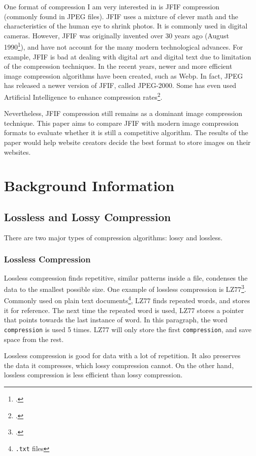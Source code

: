 \documentclass{article}
\begin{document}
One format of compression I am very interested in is JFIF compression (commonly found in JPEG files).
JFIF uses a mixture of clever math and the characteristics of the human eye to shrink photos.
It is commonly used in digital cameras.
However, JFIF was originally invented over 30 years ago (August 1990\footcite{jpeg}), and have not account for the many modern technological advances.
For example, JFIF is bad at dealing with digital art and digital text due to limitation of the compression techniques.
In the recent years, newer and more efficient image compression algorithms have been created, such as Webp. 
In fact, JPEG has released a newer version of JFIF, called JPEG-2000.
Some has even used Artificial Intelligence to enhance compression rates\footcite{googleAI}.

Nevertheless, JFIF compression still remains as a dominant image compression technique.
This paper aims to compare JFIF with modern image compression formats to evaluate whether it is still a competitive algorithm.
The results of the paper would help website creators decide the best format to store images on their websites.

\section{Background Information}

\subsection{Lossless and Lossy Compression}
\noindent There are two major types of compression algorithms: lossy and lossless.

\subsubsection{Lossless Compression}
Lossless compression finds repetitive, similar patterns inside a file, condenses the data to the smallest possible size.
One example of lossless compression is LZ77\footcite{lzYT}.
Commonly used on plain text documents\footnote{\texttt{.txt} files}, LZ77 finds repeated words, and stores it for reference.
The next time the repeated word is used, LZ77 stores a pointer that points towards the last instance of word.
In this paragraph, the word \texttt{compression} is used 5 times.
LZ77 will only store the first \texttt{compression}, and save space from the rest.

Lossless compression is good for data with a lot of repetition.
It also preserves the data it compresses, which lossy compression cannot.
On the other hand, lossless compression is less efficient than lossy compression.
\end{document}
